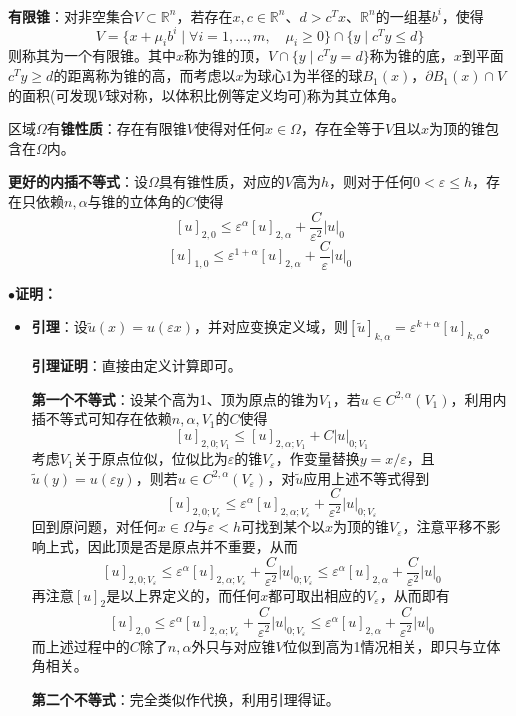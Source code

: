 \documentclass[a4paper,UTF8,fontset=windows,AutoFakeBold]{ctexart}
\newcommand{\proo}[1]{{\kaishu $\bullet$\textbf{证明：}
\begin{itemize}
    \item[] #1
\end{itemize}
}}
\begin{document}
\

\textbf{有限锥}：对非空集合$V\subset\mathbb{R}^n$，若存在$x,c\in\mathbb{R}^n$、$d>c^Tx$、$\mathbb{R}^n$的一组基$b^i$，使得
$$V=\big\{x+\mu_ib^i\mid\forall i=1,\dots,m,\quad\mu_i\ge0\big\}\cap\{y\mid c^Ty\le d\}$$
则称其为一个有限锥。其中$x$称为锥的顶，$V\cap\{y\mid c^Ty=d\}$称为锥的底，$x$到平面$c^Ty\ge d$的距离称为锥的高，而考虑以$x$为球心1为半径的球$B_1(x)$，$\partial B_1(x)\cap V$的面积(可发现$V$球对称，以体积比例等定义均可)称为其立体角。

区域$\Omega$有\textbf{锥性质}：存在有限锥$V$使得对任何$x\in\Omega$，存在全等于$V$且以$x$为顶的锥包含在$\Omega$内。

\textbf{更好的内插不等式}：设$\Omega$具有锥性质，对应的$V$高为$h$，则对于任何$0<\varepsilon\le h$，存在只依赖$n,\alpha$与锥的立体角的$C$使得
$$[u]_{2,0}\le\varepsilon^\alpha[u]_{2,\alpha}+\frac{C}{\varepsilon^2}|u|_0$$
$$[u]_{1,0}\le\varepsilon^{1+\alpha}[u]_{2,\alpha}+\frac{C}{\varepsilon}|u|_0$$
\proo{
    \textbf{引理}：设$\tilde{u}(x)=u(\varepsilon x)$，并对应变换定义域，则$[\tilde{u}]_{k,\alpha}=\varepsilon^{k+\alpha}[u]_{k,\alpha}$。

    \textbf{引理证明}：直接由定义计算即可。

    \textbf{第一个不等式}：设某个高为1、顶为原点的锥为$V_1$，若$u\in C^{2,\alpha}(V_1)$，利用内插不等式可知存在依赖$n,\alpha,V_1$的$C$使得
    $$[u]_{2,0;V_1}\le[u]_{2,\alpha;V_1}+C|u|_{0;V_1}$$
    考虑$V_1$关于原点位似，位似比为$\varepsilon$的锥$V_\varepsilon$，作变量替换$y=x/\varepsilon$，且$\tilde{u}(y)=u(\varepsilon y)$，则若$u\in C^{2,\alpha}(V_\varepsilon)$，对$\tilde{u}$应用上述不等式得到
    $$[u]_{2,0;V_\varepsilon}\le\varepsilon^\alpha[u]_{2,\alpha;V_\varepsilon}+\frac{C}{\varepsilon^2}|u|_{0;V_\varepsilon}$$
    回到原问题，对任何$x\in\Omega$与$\varepsilon<h$可找到某个以$x$为顶的锥$V_\varepsilon$，注意平移不影响上式，因此顶是否是原点并不重要，从而
    $$[u]_{2,0;V_\varepsilon}\le\varepsilon^\alpha[u]_{2,\alpha;V_\varepsilon}+\frac{C}{\varepsilon^2}|u|_{0;V_\varepsilon}\le\varepsilon^\alpha[u]_{2,\alpha}+\frac{C}{\varepsilon^2}|u|_0$$
    再注意$[u]_2$是以上界定义的，而任何$x$都可取出相应的$V_\varepsilon$，从而即有
    $$[u]_{2,0}\le\varepsilon^\alpha[u]_{2,\alpha;V_\varepsilon}+\frac{C}{\varepsilon^2}|u|_{0;V_\varepsilon}\le\varepsilon^\alpha[u]_{2,\alpha}+\frac{C}{\varepsilon^2}|u|_0$$
    而上述过程中的$C$除了$n,\alpha$外只与对应锥$V$位似到高为1情况相关，即只与立体角相关。

    \textbf{第二个不等式}：完全类似作代换，利用引理得证。
}
\end{document}
